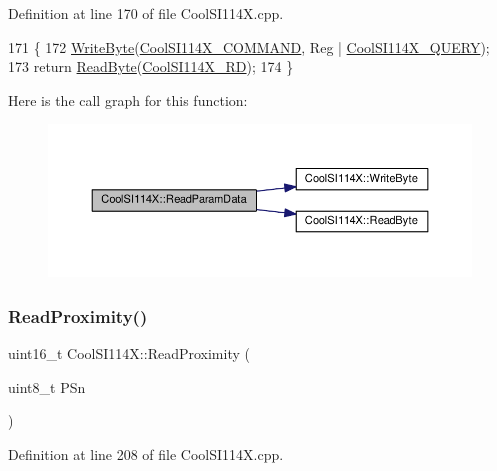 Definition at line 170 of file Cool\+S\+I114\+X.\+cpp.


\begin{DoxyCode}
171 \{
172     \hyperlink{class_cool_s_i114_x_ac5c8dc5ade604da7a1c8cd1586feefc2}{WriteByte}(\hyperlink{_cool_s_i114_x_8h_af443805ce1c198eff43fb1b840c45500}{CoolSI114X\_COMMAND}, Reg | 
      \hyperlink{_cool_s_i114_x_8h_a143885333120c564264fd83b73615afa}{CoolSI114X\_QUERY});
173     \textcolor{keywordflow}{return} \hyperlink{class_cool_s_i114_x_acc20f8037e156ec4aadcbe90780b1e8b}{ReadByte}(\hyperlink{_cool_s_i114_x_8h_af0cd5425a0d2f2993040d97d4df30c85}{CoolSI114X\_RD});
174 \}
\end{DoxyCode}
Here is the call graph for this function\+:\nopagebreak
\begin{figure}[H]
\begin{center}
\leavevmode
\includegraphics[width=350pt]{dd/d67/class_cool_s_i114_x_a33cf431103c722442f6a0cc93848d640_cgraph}
\end{center}
\end{figure}
\mbox{\label{class_cool_s_i114_x_a194fede1105508c7803dbb567cbdcc67}} 
\subsubsection{\texorpdfstring{Read\+Proximity()}{ReadProximity()}}
{\footnotesize\ttfamily uint16\+\_\+t Cool\+S\+I114\+X\+::\+Read\+Proximity (\begin{DoxyParamCaption}\item[{uint8\+\_\+t}]{P\+Sn }\end{DoxyParamCaption})}



Definition at line 208 of file Cool\+S\+I114\+X.\+cpp.


